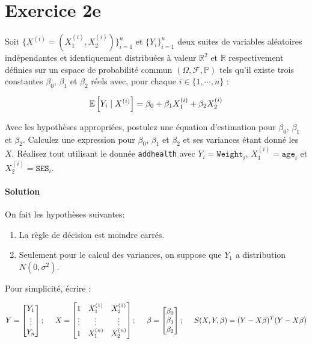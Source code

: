 \documentclass[../main.tex]{subfiles}
\begin{document}
\section{Exercice 2e}
\begin{CJK*}{UTF8}{gbsn}
Soit $\{X^{(i)} = (X^{(i)}_1,X^{(i)}_2)\}_{i=1}^n$ et $\{Y_i\}_{i=1}^n$
deux suites de variables aléatoires indépendantes et identiquement distribuées
à valeur $\mathbb{R}^2$ et $\mathbb{R}$ respectivement définies 
sur un espace de probabilité commun $(\Omega, \mathcal{F}, \mathbb{P})$ tels qu'il 
existe trois constantes $\beta_0$, $\beta_1$ et $\beta_2$ réels avec, 
pour chaque $i \in \{1, \cdots, n\}$ :

\begin{equation*}
    \mathbb{E} \squared{Y_i \mid X^{(i)}} = \beta_0 + \beta_1 X^{(i)}_1 + \beta_2 X^{(i)}_2
\end{equation*}

Avec les hypothèses appropriées, postulez une équation d'estimation pour $\beta_0$, $\beta_1$ et $\beta_2$.
Calculez une expression pour $\beta_0$, $\beta_1$ et $\beta_2$ et ses variances étant donné les $X$.
Réalisez tout utilisant le donnée \texttt{addhealth} avec $Y_i = \texttt{Weight}_i$,
$X^{(i)}_1 = \texttt{age}_i$ et $X^{(i)}_2 = \texttt{SES}_i$.

\smallskip
\paragraph{Solution}
On fait les hypothèses suivantes:

\begin{enumerate}
    \item La règle de décision est moindre carrés.
    \item Seulement pour le calcul des variances, on suppose que $Y_1$ a distribution $N(0, \sigma^2)$.
\end{enumerate}

Pour simplicité, écrire :

\begin{equation*}
    Y = 
    \begin{bmatrix}
        Y_1 \\
        \vdots \\
        Y_n
    \end{bmatrix}; \tab[0.5cm]
    X =
    \begin{bmatrix}
        1 & X^{(1)}_1 & X^{(1)}_2 \\
        \vdots & \vdots & \vdots \\
        1 & X^{(n)}_1 & X^{(n)}_2
    \end{bmatrix}; \tab[0.5cm]
    \beta =
    \begin{bmatrix}
        \beta_0 \\
        \beta_1 \\
        \beta_2
    \end{bmatrix}; \tab[0.5cm]
    S(X,Y,\beta) = (Y-X\beta)^T(Y-X\beta)
\end{equation*}


\end{CJK*}
\end{document}
